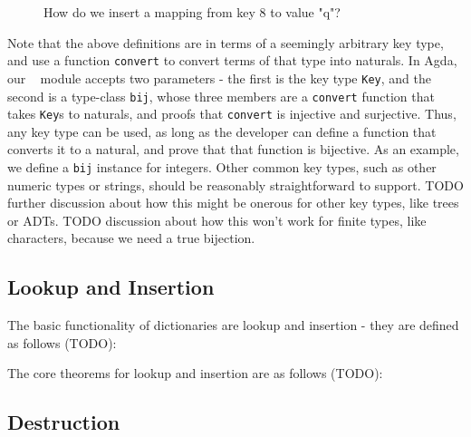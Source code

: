 \begin{figure}[H]
  \centering
  \caption{How do we insert a mapping from key $8$ to value "q"?}
  \label{fig:find-6}
\end{figure}

Note that the above definitions are in terms of a seemingly arbitrary key type,
and use a function \texttt{convert} to convert terms of that type into naturals.
In Agda, our \dd~ module accepts two parameters - the first is the key type \texttt{Key},
and the second is a type-class \texttt{bij}, whose three members are a \texttt{convert}
function that takes \texttt{Key}s to naturals, and proofs that \texttt{convert} is
injective and surjective. Thus, any key type can be used, as long as the developer
can define a function that converts it to a natural, and prove that that function is
bijective. As an example, we define a \texttt{bij} instance for integers. Other common
key types, such as other numeric types or strings, should be reasonably straightforward
to support. TODO further discussion about how this might be onerous for other key types,
like trees or ADTs. TODO discussion about how this won't work for finite types, like
characters, because we need a true bijection.

\subsection{Lookup and Insertion}
\label{sec:DD:basics}
The basic functionality of dictionaries are lookup and insertion - they are defined as follows
(TODO):

The core theorems for lookup and insertion are as follows (TODO):

\subsection{Destruction}

